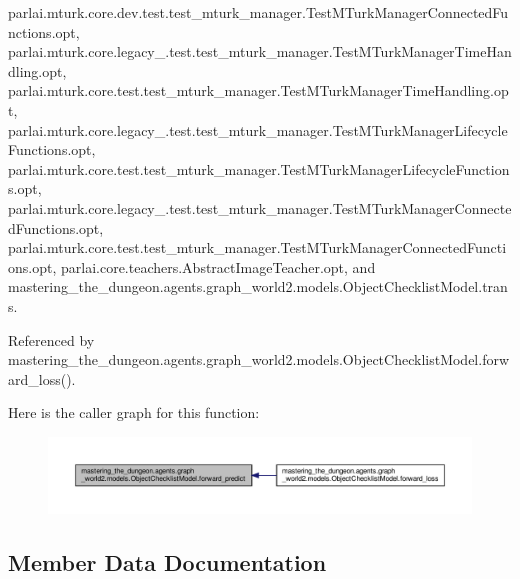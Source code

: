 parlai.\+mturk.\+core.\+dev.\+test.\+test\+\_\+mturk\+\_\+manager.\+Test\+M\+Turk\+Manager\+Connected\+Functions.\+opt, parlai.\+mturk.\+core.\+legacy\+\_.\+test.\+test\+\_\+mturk\+\_\+manager.\+Test\+M\+Turk\+Manager\+Time\+Handling.\+opt, parlai.\+mturk.\+core.\+test.\+test\+\_\+mturk\+\_\+manager.\+Test\+M\+Turk\+Manager\+Time\+Handling.\+opt, parlai.\+mturk.\+core.\+legacy\+\_.\+test.\+test\+\_\+mturk\+\_\+manager.\+Test\+M\+Turk\+Manager\+Lifecycle\+Functions.\+opt, parlai.\+mturk.\+core.\+test.\+test\+\_\+mturk\+\_\+manager.\+Test\+M\+Turk\+Manager\+Lifecycle\+Functions.\+opt, parlai.\+mturk.\+core.\+legacy\+\_.\+test.\+test\+\_\+mturk\+\_\+manager.\+Test\+M\+Turk\+Manager\+Connected\+Functions.\+opt, parlai.\+mturk.\+core.\+test.\+test\+\_\+mturk\+\_\+manager.\+Test\+M\+Turk\+Manager\+Connected\+Functions.\+opt, parlai.\+core.\+teachers.\+Abstract\+Image\+Teacher.\+opt, and mastering\+\_\+the\+\_\+dungeon.\+agents.\+graph\+\_\+world2.\+models.\+Object\+Checklist\+Model.\+trans.



Referenced by mastering\+\_\+the\+\_\+dungeon.\+agents.\+graph\+\_\+world2.\+models.\+Object\+Checklist\+Model.\+forward\+\_\+loss().

Here is the caller graph for this function\+:
\nopagebreak
\begin{figure}[H]
\begin{center}
\leavevmode
\includegraphics[width=350pt]{classmastering__the__dungeon_1_1agents_1_1graph__world2_1_1models_1_1ObjectChecklistModel_aabcbed1be0d98035d2cfc4d3ad151256_icgraph}
\end{center}
\end{figure}


\subsection{Member Data Documentation}
\mbox{\label{classmastering__the__dungeon_1_1agents_1_1graph__world2_1_1models_1_1ObjectChecklistModel_a21c0616875ad2f5f4457286fb9847052}} 
